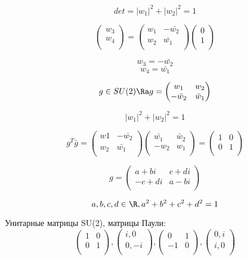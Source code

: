 $$
det = |w_1|^2+|w_2|^2 = 1 
$$

$$
\begin{pmatrix}
w_3\\
w_4\\
\end{pmatrix}
= 
\begin{pmatrix}
w_1&-\bar{w_2}\\
w_2& \bar{w_1}\\
\end{pmatrix}
\begin{pmatrix}
0\\
1\\
\end{pmatrix}
$$

$$w_3 = -\bar{w_2}$$
$$w_4 = \bar{w_1}$$

$$g \in SU(2) \Ra g = 
\begin{pmatrix}
w_1&w_2\\
-\bar w_2& \bar w_1\\
\end{pmatrix}$$

$$|w_1|^2 + |w_2|^2 = 1$$

$$g^T\bar{g} = \begin{pmatrix}
  w1& -\bar{w_2}\\
  w_2 & \bar{w_1}\\
 \end{pmatrix}
 \begin{pmatrix}
 \bar{w_1}&\bar w_2\\
 -w_2&w_1\\
 \end{pmatrix} = 
 \begin{pmatrix}
 1&0\\
 0&1\\
 \end{pmatrix}
$$

$$
g = \begin{pmatrix}
a+ bi& c+di\\
-c+di&a - bi\\
\end{pmatrix}
$$


$$a, b, c, d \in \R, a^2 + b^2 + c^2 + d^2 = 1$$

Унитарные матрицы SU(2), матрицы Паули:
$$ 
\begin{pmatrix}
1&0\\
0&1\\
\end{pmatrix},
\begin{pmatrix}
i, 0\\
0,  -i\\
\end{pmatrix},
\begin{pmatrix}
0 & 1\\
-1&0\\
\end{pmatrix},
\begin{pmatrix}
0, i\\
i, 0\\
\end{pmatrix}
$$

